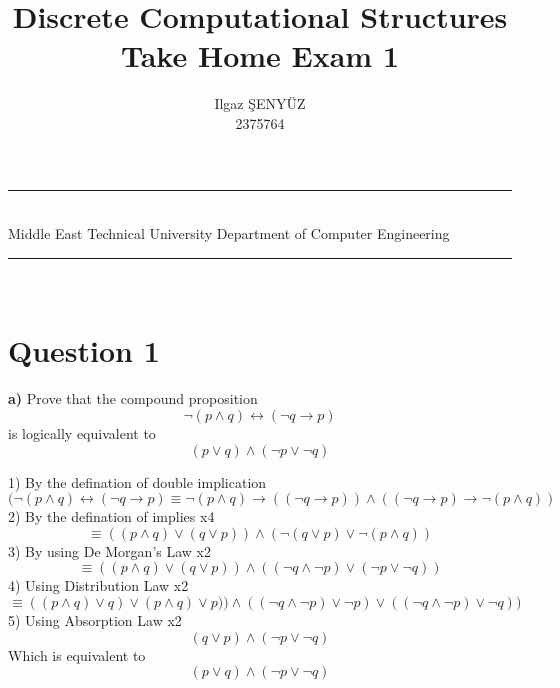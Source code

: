 \documentclass[a4paper,12pt]{article}
\title{Discrete Computational Structures \\ Take Home Exam 1}
\author{Ilgaz ŞENYÜZ \\ 2375764} %
\date{} %
\newcommand{\HRule}{\rule{\linewidth}{1mm}}
\newcommand\tab[1][1cm]{\hspace*{#1}}
\begin{document}
\HRule\\
Middle East Technical University \hfill Department of Computer Engineering
{\let\newpage\relax\maketitle}
\HRule\\
\vspace{1cm}


\section*{Question 1 \hfill {}}

\tab \textbf{a)} Prove that the compound proposition
\begin{equation*}
    \neg(p\wedge q) \leftrightarrow (\neg q \rightarrow p)
\end{equation*} 
    \tab is logically equivalent to
\begin{equation*}
    (p\vee q) \wedge (\neg p \vee \neg q)
\end{equation*} 
\begin{tcolorbox}
1) By the defination of double implication
\begin{displaymath}
(\neg(p\wedge q) \leftrightarrow (\neg q \rightarrow p) \equiv \neg(p \wedge q) \rightarrow ( (\neg q \rightarrow p) ) \wedge ( (\neg q \rightarrow p)\rightarrow \neg(p \wedge q) )
\end{displaymath}
2) By the defination of implies x4
\begin{displaymath}
\equiv ( (p \wedge q) \vee ( q \vee p) ) \wedge ( \neg( q \vee p)\vee \neg(p \wedge q) )
\end{displaymath}
3) By using De Morgan's Law x2
\begin{displaymath}
\equiv ( (p \wedge q) \vee ( q \vee p) ) \wedge ( ( \neg q \wedge \neg p)\vee (\neg p \vee \neg q) )
\end{displaymath}
4) Using Distribution Law x2
\begin{displaymath}
\equiv ( (p \wedge q) \vee q)  \vee (p \wedge q) \vee p) ) \wedge ( ( \neg q \wedge \neg p)\vee \neg p) \vee (( \neg q \wedge \neg p)\vee \neg q) )
\end{displaymath}
5) Using Absorption Law x2
\begin{displaymath}
(q \vee p) \wedge (\neg p \vee \neg q)
\end{displaymath}
Which is equivalent to 
\begin{equation*}
    (p\vee q) \wedge (\neg p \vee \neg q)
\end{equation*} \\

\end{tcolorbox}
\end{document}
